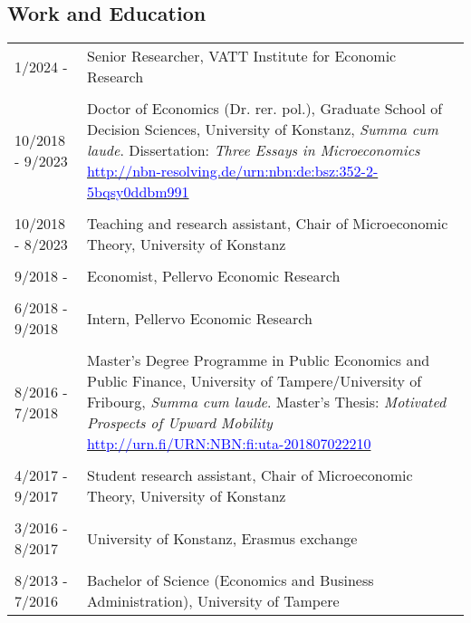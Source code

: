 \documentclass[16pt]{article}
\begin{document}
\subsection*{Work and Education}
\begin{tabular}{@{}p{1.5in}p{5in}}

1/2024 -       & Senior Researcher, VATT Institute for Economic Research \\

\\
10/2018 - 9/2023  & Doctor of Economics (Dr. rer. pol.), Graduate School of Decision Sciences, University of Konstanz, \textit{Summa cum laude}. Dissertation: \textit{Three Essays in Microeconomics} \href{http://nbn-resolving.de/urn:nbn:de:bsz:352-2-5bqsy0ddbm991}{\textcolor{blue}{http://nbn-resolving.de/urn:nbn:de:bsz:352-2-5bqsy0ddbm991}} \\

\\
10/2018 - 8/2023  & Teaching and research assistant, Chair of Microeconomic Theory,  University of Konstanz \\

                                                 
\\
9/2018 -            & Economist, Pellervo Economic Research\\

\\
6/2018 - 9/2018 & Intern, Pellervo Economic Research\\

\\
8/2016 - 7/2018 & Master's Degree Programme in Public Economics and Public Finance, University of Tampere/University of Fribourg, \textit{Summa cum laude}. Master's Thesis: \textit{Motivated Prospects of Upward Mobility} \href{http://urn.fi/URN:NBN:fi:uta-201807022210}{\textcolor{blue}{http://urn.fi/URN:NBN:fi:uta-201807022210}}\\

\\
4/2017 - 9/2017 & Student research assistant, Chair of Microeconomic Theory,  University of Konstanz\\

\\
3/2016 - 8/2017 & University of Konstanz, Erasmus exchange \\
\\
8/2013 - 7/2016 & Bachelor of Science (Economics and Business Administration), University of Tampere\\
                           
\end{tabular}
\end{document}
